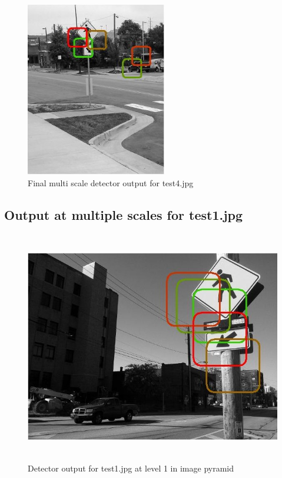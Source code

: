 \documentclass[11pt,psfig]{article}
\begin{document}
\begin{figure}[H]
\centering
\includegraphics[height=3in]{prob5b_plot2.jpg}
\caption{Final multi scale detector output for test4.jpg}
\end{figure}

\subsection*{Output at multiple scales for test1.jpg}

\begin{figure}[H]
\centering
\includegraphics[height=4in]{prob5b_plot1_level1.jpg}
\caption{Detector output for test1.jpg at level 1 in image pyramid}
\end{figure}
\end{document}
